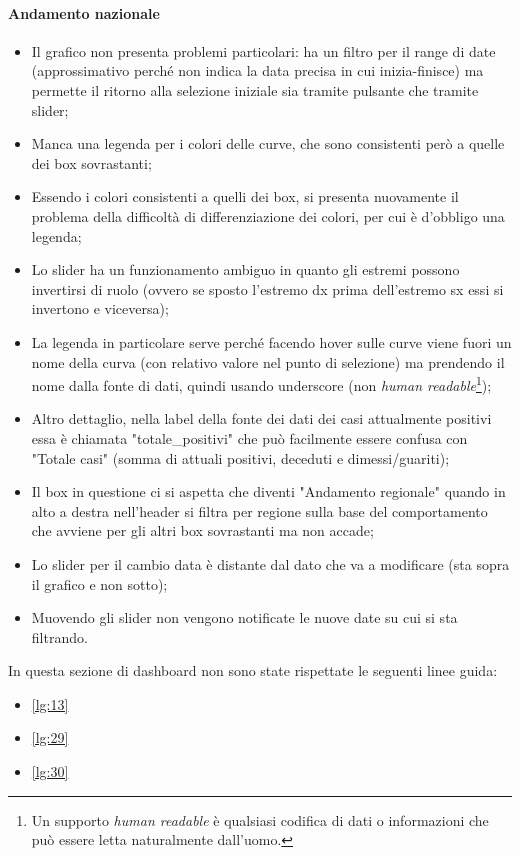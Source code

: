 \paragraph{Andamento nazionale}
\begin{itemize}
    \item Il grafico non presenta problemi particolari: ha un filtro per il range di date (approssimativo perché non indica la data precisa in cui inizia-finisce) ma permette il ritorno alla selezione iniziale sia tramite pulsante che tramite slider;
    \item Manca una legenda per i colori delle curve, che sono consistenti però a quelle dei box sovrastanti;
    \item Essendo i colori consistenti a quelli dei box, si presenta nuovamente il problema della difficoltà di differenziazione dei colori, per cui è d'obbligo una legenda;
    \item Lo slider ha un funzionamento ambiguo in quanto gli estremi possono invertirsi di ruolo (ovvero se sposto l'estremo dx prima dell'estremo sx essi si invertono e viceversa);
    \item La legenda in particolare serve perché facendo hover sulle curve viene fuori un nome della curva (con relativo valore nel punto di selezione) ma prendendo il nome dalla fonte di dati, quindi usando underscore (non \textit{human readable}\footnote{Un supporto \textit{human readable} è qualsiasi codifica di dati o informazioni che può essere letta naturalmente dall'uomo.});
    \item Altro dettaglio, nella label della fonte dei dati dei casi attualmente positivi essa è chiamata "totale\_positivi" che può facilmente essere confusa con "Totale casi" (somma di attuali positivi, deceduti e dimessi/guariti);
    \item Il box in questione ci si aspetta che diventi "Andamento regionale" quando in alto a destra nell'header si filtra per regione sulla base del comportamento che avviene per gli altri box sovrastanti ma non accade;
    \item Lo slider per il cambio data è distante dal dato che va a modificare (sta sopra il grafico e non sotto);
    \item Muovendo gli slider non vengono notificate le nuove date su cui si sta filtrando.
\end{itemize}
In questa sezione di dashboard non sono state rispettate le seguenti linee guida:
\begin{itemize}
    \item \ref{lg:13}
    \item \ref{lg:29}
    \item \ref{lg:30}
\end{itemize}

